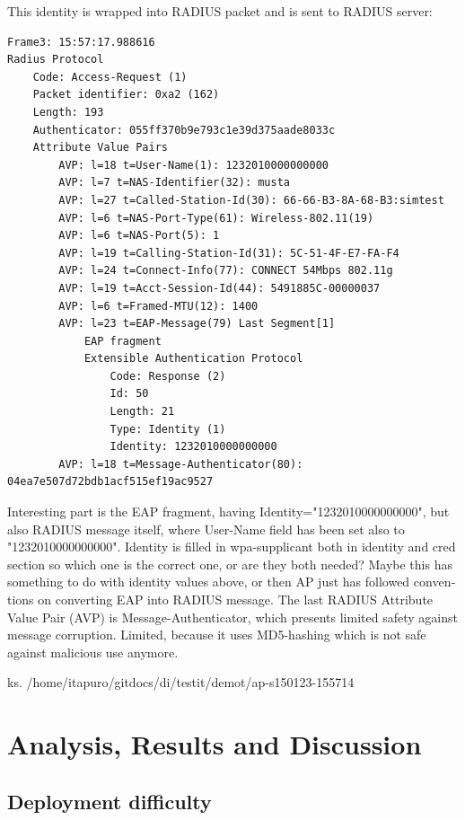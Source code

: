 \documentclass[12pt,a4paper,english]{tutthesis}
\begin{document}
\begin{otherlanguage}{english}
This identity is wrapped into RADIUS packet and is sent to RADIUS
server:
\begin{verbatim}
Frame3: 15:57:17.988616
Radius Protocol
    Code: Access-Request (1)
    Packet identifier: 0xa2 (162)
    Length: 193
    Authenticator: 055ff370b9e793c1e39d375aade8033c
    Attribute Value Pairs
        AVP: l=18 t=User-Name(1): 1232010000000000
        AVP: l=7 t=NAS-Identifier(32): musta
        AVP: l=27 t=Called-Station-Id(30): 66-66-B3-8A-68-B3:simtest
        AVP: l=6 t=NAS-Port-Type(61): Wireless-802.11(19)
        AVP: l=6 t=NAS-Port(5): 1
        AVP: l=19 t=Calling-Station-Id(31): 5C-51-4F-E7-FA-F4
        AVP: l=24 t=Connect-Info(77): CONNECT 54Mbps 802.11g
        AVP: l=19 t=Acct-Session-Id(44): 5491885C-00000037
        AVP: l=6 t=Framed-MTU(12): 1400
        AVP: l=23 t=EAP-Message(79) Last Segment[1]
            EAP fragment
            Extensible Authentication Protocol
                Code: Response (2)
                Id: 50
                Length: 21
                Type: Identity (1)
                Identity: 1232010000000000
        AVP: l=18 t=Message-Authenticator(80): 04ea7e507d72bdb1acf515ef19ac9527
\end{verbatim}
Interesting part is the EAP fragment, having
Identity="1232010000000000", but
also RADIUS message itself, where User-Name field has been set also 
to "1232010000000000". 
Identity is filled in wpa-supplicant both in identity and cred
section so which one is the correct one, or are they both needed?
Maybe this has something to do with identity
values above, or then AP just has followed conventions on converting
EAP into RADIUS message. The last RADIUS Attribute Value Pair (AVP) is 
Message-Authenticator, which presents limited safety against message 
corruption. Limited, because it uses MD5-hashing which is not safe
against malicious use anymore.






ks. /home/itapuro/gitdocs/di/testit/demot/ap-s150123-155714


\chapter{Analysis, Results and Discussion}
\label{sec-6}



\section{Deployment difficulty}
\label{sec-6-1}


\end{otherlanguage}
\end{document}
